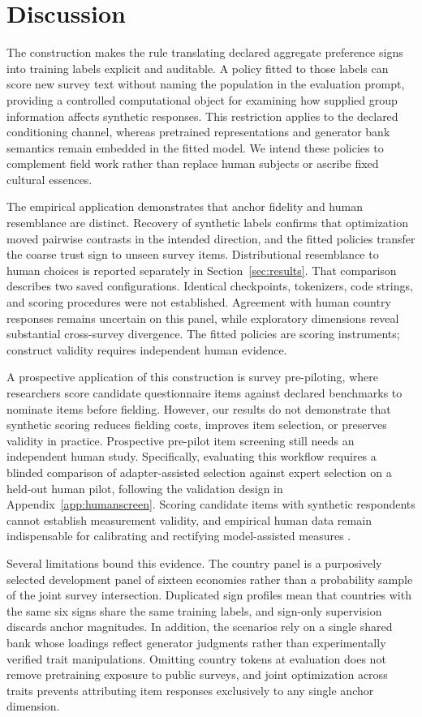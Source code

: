 \section{Discussion}\label{sec:discussion}
The construction makes the rule translating declared aggregate preference signs into training labels explicit and auditable. A policy fitted to those labels can score new survey text without naming the population in the evaluation prompt, providing a controlled computational object for examining how supplied group information affects synthetic responses. This restriction applies to the declared conditioning channel, whereas pretrained representations and generator bank semantics remain embedded in the fitted model. We intend these policies to complement field work rather than replace human subjects or ascribe fixed cultural essences.

The empirical application demonstrates that anchor fidelity and human resemblance are distinct. Recovery of synthetic labels confirms that optimization moved pairwise contrasts in the intended direction, and the fitted policies transfer the coarse trust sign to unseen survey items. Distributional resemblance to human choices is reported separately in Section~\ref{sec:results}. That comparison describes two saved configurations. Identical checkpoints, tokenizers, code strings, and scoring procedures were not established. Agreement with human country responses remains uncertain on this panel, while exploratory dimensions reveal substantial cross-survey divergence. The fitted policies are scoring instruments; construct validity requires independent human evidence.

A prospective application of this construction is survey pre-piloting, where researchers score candidate questionnaire items against declared benchmarks to nominate items before fielding. However, our results do not demonstrate that synthetic scoring reduces fielding costs, improves item selection, or preserves validity in practice. Prospective pre-pilot item screening still needs an independent human study. Specifically, evaluating this workflow requires a blinded comparison of adapter-assisted selection against expert selection on a held-out human pilot, following the validation design in Appendix~\ref{app:humanscreen}. Scoring candidate items with synthetic respondents cannot establish measurement validity, and empirical human data remain indispensable for calibrating and rectifying model-assisted measures \cite{krsteski2026}.

Several limitations bound this evidence. The country panel is a purposively selected development panel of sixteen economies rather than a probability sample of the joint survey intersection. Duplicated sign profiles mean that countries with the same six signs share the same training labels, and sign-only supervision discards anchor magnitudes. In addition, the scenarios rely on a single shared bank whose loadings reflect generator judgments rather than experimentally verified trait manipulations. Omitting country tokens at evaluation does not remove pretraining exposure to public surveys, and joint optimization across traits prevents attributing item responses exclusively to any single anchor dimension.
